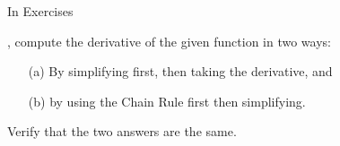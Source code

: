 {\noindent In Exercises}
{, compute the derivative of the given function in two ways:
\begin{enumerate}
\item[(a)] By simplifying first, then taking the derivative, and
\item [(b)] by using the Chain Rule first then simplifying.
\end{enumerate}
Verify that the two answers are the same.%
}
